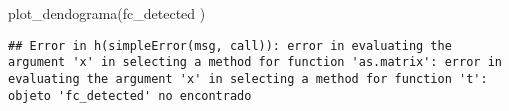 \documentclass[
]{book}
\newenvironment{Shaded}{\begin{snugshade}}{\end{snugshade}}
\newcommand{\FunctionTok}[1]{\textcolor[rgb]{0.00,0.00,0.00}{#1}}
\newcommand{\NormalTok}[1]{#1}
\begin{document}
\begin{Shaded}
\begin{Highlighting}[]
\FunctionTok{plot\_dendograma}\NormalTok{(fc\_detected )}
\end{Highlighting}
\end{Shaded}

\begin{verbatim}
## Error in h(simpleError(msg, call)): error in evaluating the argument 'x' in selecting a method for function 'as.matrix': error in evaluating the argument 'x' in selecting a method for function 't': objeto 'fc_detected' no encontrado
\end{verbatim}

  
\end{document}
